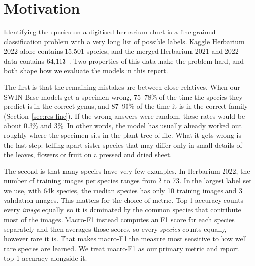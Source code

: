 \documentclass[11pt]{article}
\begin{document}
\begin{abstract}
Two data checks matter for interpreting all of this. Between 1.7\% and 3\% of validation
images have a copy of the same physical specimen in the training set, which inflates
absolute accuracy by a fraction of a point equally for every loss. And the ladder's
validation sets contain many easier Herbarium 2021 images, so ladder scores can be
compared between losses but not with the 15.5k-species ablation. Neither issue changes
which loss wins.
\end{abstract}

\section{Motivation}
\label{sec:intro}

Identifying the species on a digitised herbarium sheet is a fine-grained classification
problem with a very long list of possible labels. Kaggle Herbarium 2022 alone contains
15{,}501 species, and the merged Herbarium 2021 and 2022 data contains
64{,}113~\citep{herb2021}. Two properties of this data make the problem hard, and both
shape how we evaluate the models in this report.

The first is that the remaining mistakes are between close relatives. When our SWIN-Base
models get a specimen wrong, 75--78\% of the time the species they predict is in the
correct genus, and 87--90\% of the time it is in the correct family
(Section~\ref{sec:res-fine}). If the wrong answers were random, these rates would be
about 0.3\% and 3\%. In other words, the model has usually already worked out roughly
where the specimen sits in the plant tree of life. What it gets wrong is the last step:
telling apart sister species that may differ only in small details of the leaves,
flowers or fruit on a pressed and dried sheet.

The second is that many species have very few examples. In Herbarium 2022, the number
of training images per species ranges from 2 to 73. In the largest label set we use,
with 64k species, the median species has only 10 training images and 3 validation
images. This matters for the choice of metric. Top-1 accuracy counts every
\emph{image} equally, so it is dominated by the common species that contribute most of
the images. Macro-F1 instead computes an F1 score for each species separately and then
averages those scores, so every \emph{species} counts equally, however rare it is. That
makes macro-F1 the measure most sensitive to how well rare species are learned. We
treat macro-F1 as our primary metric and report top-1 accuracy alongside it.
\end{document}
